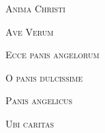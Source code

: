 \documentclass[11pt,a5paper,twoside]{memoir} %
\begin{document}
\clearpage
\begin{center}\begin{huge}\textsc{Anima Christi}\end{huge}\end{center}
\begin{center}\begin{huge}\textsc{Ave Verum}\end{huge}\end{center}
\begin{center}\begin{huge}\textsc{Ecce panis angelorum}\end{huge}\end{center}
\begin{center}\begin{huge}\textsc{O panis dulcissime}\end{huge}\end{center}
\clearpage
\begin{center}\begin{huge}\textsc{Panis angelicus}\end{huge}\end{center}
\begin{center}\begin{huge}\textsc{Ubi caritas}\end{huge}\end{center}
\end{document}
